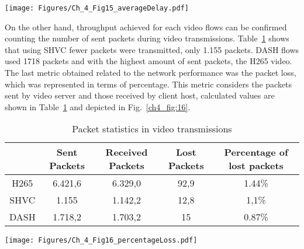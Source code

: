 \begin{center}
\texttt{[image: Figures/Ch\_4\_Fig15\_averageDelay.pdf]}
\label{ch4_fig:15}       %
\end{center}


On the other hand, throughput achieved for each video flows can be confirmed counting the number of sent packets during video transmissions. Table~\ref{ch4_tab:1} shows that using SHVC fewer packets were transmitted, only 1.155 packets. DASH flows used 1718 packets and with the highest amount of sent packets, the H265 video. The last metric obtained related to the network performance was the packet loss, which was represented in terms of percentage. This metric considers the packets sent by video server and those received by client host, calculated values are shown in Table~\ref{ch4_tab:1} and depicted in Fig.~\ref{ch4_fig:16}.

\begin{table}[ht!]
    \centering
\caption{Packet statistics in video transmissions}
\label{ch4_tab:1}
    \begin{tabular}{|c|c|c|c|c|}
         \hline
 & Sent Packets & Received Packets & Lost Packets & Percentage of lost packets \\
\hline
H265 & 6.421,6 & 6.329,0 & 92,9 & 1.44\% \\
\hline
SHVC & 1.155 & 1.142,2 & 12,8 & 1,1\% \\
\hline
DASH & 1.718,2 & 1.703,2 & 15 & 0.87\%\\
\hline
    \end{tabular}
\end{table}

\begin{center}
\texttt{[image: Figures/Ch\_4\_Fig16\_percentageLoss.pdf]}
\label{ch4_fig:16}       %
\end{center}


